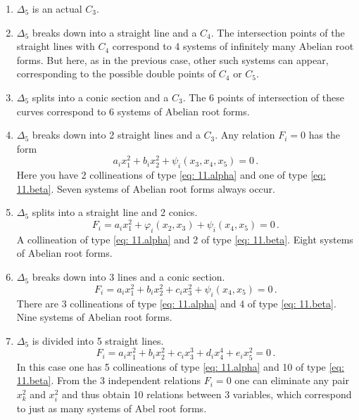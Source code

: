 \documentclass[leqno]{article}
\begin{document}
\begin{enumerate}[label=\arabic*)]
	\item $\Delta_5$ is an actual $C_3$.
	\item $\Delta_5$ breaks down into a straight line and a $C_4$. The intersection points of the straight lines with $C_4$ correspond to 4 systems of infinitely many Abelian root forms. But here, as in the previous case, other such systems can appear, corresponding to the possible double points of $C_4$ or $C_5$.
	\item $\Delta_5$ splits into a conic section and a $C_3$. The 6 points of intersection of these curves correspond to 6 systems of Abelian root forms.
	\item $\Delta_5$ breaks down into 2 straight lines and a $C_3$. Any relation $F_i=0$ has the form
	\begin{equation}\label{eq: 11.c}
	a_i x_1^2 + b_i x_2^2 + \psi_i(x_3, x_4, x_5) = 0 \, . \tag{c}
	\end{equation}
	Here you have 2 collineations of type \eqref{eq: 11.alpha} and one of type \eqref{eq: 11.beta}. Seven systems of Abelian root forms always occur.
	\item $\Delta_5$ splits into a straight line and 2 conics.
	\begin{equation}\label{eq: 11.d}
	    F_i = a_i x_1^2 + \varphi_i(x_2, x_3) + \psi_i(x_4, x_5) = 0 \, . \tag{d}
	\end{equation}
	A collineation of type \eqref{eq: 11.alpha} and 2 of type \eqref{eq: 11.beta}. Eight systems of Abelian root forms.
	\item $\Delta_5$ breaks down into 3 lines and a conic section.
	\begin{equation}\label{eq: 11.e}
	    F_i = a_i x_1^2 + b_i x_2^2 + c_i x_3^2 + \psi_i(x_4, x_5) = 0 \, . \tag{e}
	\end{equation}
	There are 3 collineations of type \eqref{eq: 11.alpha} and 4 of type \eqref{eq: 11.beta}. Nine systems of Abelian root forms.
	\item $\Delta_5$ is divided into 5 straight lines. 
	\begin{equation}\label{eq: 11.f}
	F_i = a_i x_1^2 + b_i x_2^2 + c_i x_3^3 + d_i x_4^4 + e_i x_5^2 = 0 \, . \tag{f}
	\end{equation}
	In this case one has 5 collineations of type \eqref{eq: 11.alpha} and 10 of type \eqref{eq: 11.beta}. From the 3 independent relations $F_i=0$ one can eliminate any pair $x_k^2$ and $x_i^2$ and thus obtain 10 relations between 3 variables, which correspond to just as many systems of Abel root forms.
\end{enumerate}
\end{document}
